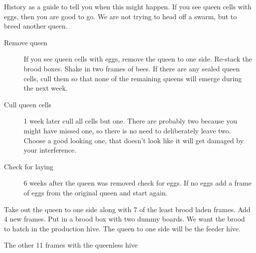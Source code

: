 History as a guide to tell you when this might happen.
If you see queen cells with eggs,
then you are good to go.
We are not trying to head off a swarm,
but to breed another queen.

\begin{description}
  \item[Remove queen] If you see queen cells with eggs, remove the queen to one side.
    Re-stack the brood boxes.
    Shake in two frames of bees.
    If there are any sealed queen cells, cull them so that none of the remaining queens will emerge during the next week.
  \item[Cull queen cells] 1 week later cull all cells but one.
    There are probably two because you might have missed one, so there is no need to deliberately leave two.
    Choose a good looking one,
    that doesn't look like it will get damaged by your interference.
  \item[Check for laying] 6 weeks after the queen was removed check for eggs.
    If no eggs add a frame of eggs from the original queen
    and start again. 
\end{description}

Take out the queen to one side along with 7 of the least brood laden frames.  
Add 4 new frames.
Put in a brood box with two dummy boards.
We want the brood to hatch in the production hive.
The queen to one side will be the feeder hive.

The other 11 frames with the queenless hive

